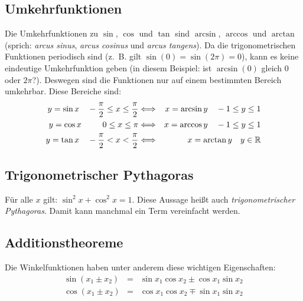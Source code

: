 \subsection{Umkehrfunktionen}%
Die Umkehrfunktionen zu $\sin$, $\cos$ und $\tan$ sind $\arcsin$, $\arccos$
und $\arctan$ (sprich: \emph{arcus sinus}, \emph{arcus cosinus} und
\emph{arcus tangens}). Da die trigonometrischen Funktionen periodisch sind
(z.~B. gilt $\sin(0) = \sin(2\pi)=0$), kann es keine eindeutige Umkehrfunktion
geben (in diesem Beispiel: ist $\arcsin(0)$ gleich $0$ oder $2\pi$?).
Deswegen sind die Funktionen nur auf einem bestimmten Bereich umkehrbar.
Diese Bereiche sind:
\begin{eqnarray*}
y = \sin x\quad -\frac{\pi}{2} \leq x \leq \frac{\pi}{2} &
\Longleftrightarrow &
x = \arcsin y \quad -1 \leq y \leq 1 \\
y = \cos x\quad \phantom{--}0 \leq x \leq \pi &
\Longleftrightarrow &
x = \arccos y \quad -1 \leq y \leq 1\\
y = \tan x\quad -\frac{\pi}{2} < x < \frac{\pi}{2} &
\Longleftrightarrow &
x = \arctan y \quad y\in \mathbb{R}
\end{eqnarray*}

\subsection{Trigonometrischer Pythagoras}
Für alle $x$ gilt: $\sin^2 x + \cos^2 x = 1$. Diese Aussage heißt auch
\emph{trigonometrischer Pythagoras}. Damit kann manchmal ein Term vereinfacht
werden.

\subsection{Additionstheoreme}
Die Winkelfunktionen haben unter anderem diese wichtigen Eigenschaften:
\begin{eqnarray*}
 \sin(x_1 \pm x_2) &=& \sin x_1 \cos x_2 \pm \cos x_1 \sin x_2\\
 \cos(x_1 \pm x_2) &=& \cos x_1 \cos x_2 \mp \sin x_1 \sin x_2\\
\end{eqnarray*}

